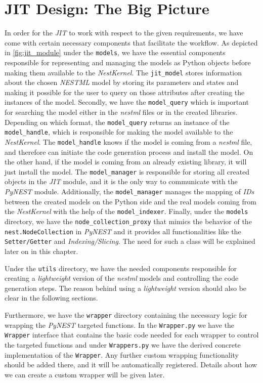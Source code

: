 

\section{JIT Design: The Big Picture}

In order for the \emph{JIT} to work with respect to the given requirements, we have come with certain necessary components that facilitate the workflow. As depicted in \autoref{fig:jit_module} under the \texttt{models}, we have the essential components responsible for representing and managing the models as Python objects before making them available to the \emph{NestKernel}. The \texttt{jit\_model} stores information about the chosen \emph{NESTML} model by storing its parameters and states and making it possible for the user to query on those attributes after creating the instances of the model. Secondly, we have the \texttt{model\_query} which is important for searching the model either in the \emph{nestml} files or in the created libraries. Depending on which format, the \texttt{model\_query} returns an instance of the \texttt{model\_handle}, which is responsible for making the model available to the \emph{NestKernel}. The  \texttt{model\_handle} knows if the model is coming from a \emph{nestml} file, and therefore can initiate the code generation process and install the model. On the other hand, if the model is coming from an already existing library, it will just install the model. The \texttt{model\_manager} is responsible for storing all created objects in the \emph{JIT} module, and it is the only way to communicate with the \emph{PyNEST} module. Additionally, the \texttt{model\_manager} manages the mapping of \emph{IDs} between the created models on the Python side and the real models coming from the \emph{NestKernel} with the help of the \texttt{model\_indexer}. Finally, under the \texttt{models} directory, we have the \texttt{node\_collection\_proxy} that mimics the behavior of the \texttt{nest.NodeCollection} in \emph{PyNEST} and it provides all functionalities like the \texttt{Setter/Getter} and \emph{Indexing/Slicing}. The need for such a class will be explained later on in this chapter. 


Under the \texttt{utils} directory, we have the needed components responsible for creating a \emph{lightweight} version of the \emph{nestml} models and controlling the code generation steps. The reason behind using a \emph{lightweight} version should also be clear in the following sections.

Furthermore, we have the \texttt{wrapper} directory containing the necessary logic for wrapping the \emph{PyNEST} targeted functions. In the \texttt{Wrapper.py} we have the \texttt{Wrapper} interface that contains the basic code needed for each wrapper to control the targeted functions and under \texttt{Wrappers.py} we have the derived concrete implementation of the \texttt{Wrapper}. Any further custom wrapping functionality should be added there, and it will be automatically registered. Details about how we can create a custom wrapper will be given later.

